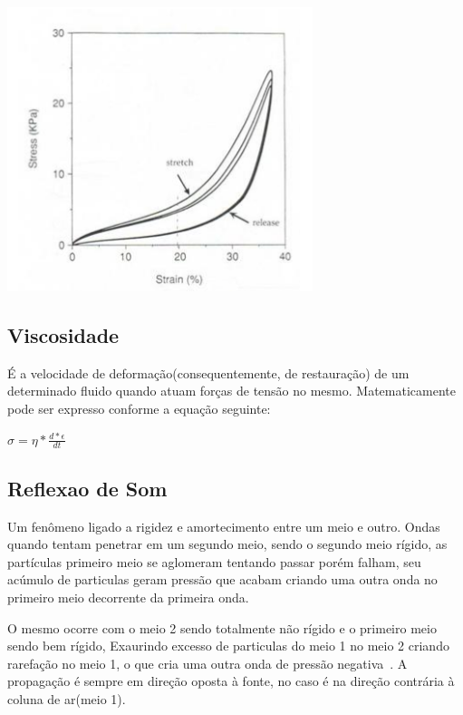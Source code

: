 		\includegraphics{figura1.png}
		
	\subsection{Viscosidade}
		É a velocidade de deformação(consequentemente, de restauração) de
		um determinado fluido quando atuam forças de tensão no mesmo. Matematicamente
		pode ser expresso conforme a equação seguinte: 
		
		$
		\sigma = \eta * \frac{d*\epsilon}{dt}
		$
	
	\subsection{Reflexao de Som}
	
		Um fenômeno ligado a rigidez e amortecimento entre um meio e outro.\cite{MTAGENTE}
		Ondas quando tentam penetrar em um segundo meio, sendo o segundo meio rígido, as partículas primeiro meio se aglomeram tentando passar porém
		falham, seu acúmulo de particulas geram pressão que acabam criando uma outra onda no primeiro meio decorrente da primeira onda.\cite{HenryGray}
		
		O mesmo ocorre com o meio 2 sendo totalmente não rígido e o primeiro meio sendo bem rígido, Exaurindo excesso de particulas  do meio 1 no meio 2 criando rarefação no meio 1, o que cria uma outra onda de pressão negativa~\cite{FlanaganLandgraf}. A propagação é sempre em direção oposta à fonte, no caso é na direção contrária à coluna de ar(meio 1). 
		
	
	
		





